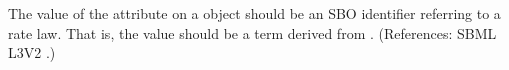 The value of the attribute  on a \KineticLaw object should
be an SBO identifier referring to a rate law.  That is, the value should be
a term derived from \sboratelaw.  (References: SBML L3V2
.)
